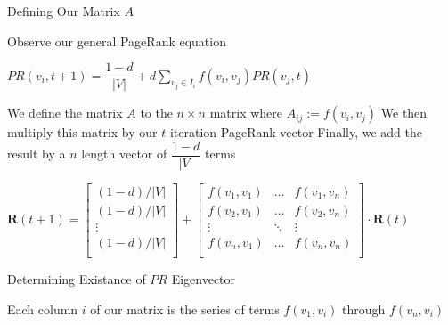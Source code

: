 \documentclass{beamer}
\begin{document}
\begin{frame}[t]{Defining Our Matrix $A$}
    \begin{outline}
        \1 Observe our general PageRank equation
        \begin{mdframed}[backgroundcolor=blue!20]
            \begin{center}
                \begin{math}
                    PR(v_i, t+1) = \dfrac{1-d}{|V|} + d\sum\limits_{v_j \in I_i} f(v_i, v_j) PR(v_j, t)
                \end{math}
            \end{center}
        \end{mdframed}
        \1 We define the matrix $A$ to the $n\times n$ matrix where $A_{ij}:= f(v_i, v_j)$
        \1 We then multiply this matrix by our $t$ iteration PageRank vector
        \1 Finally, we add the result by a $n$ length vector of $\dfrac{1-d}{|V|}$ terms
        \begin{center}
            \begin{math}
                \mathbf{R}(t+1) = \begin{bmatrix}
                    (1-d)/|V|\\
                    (1-d)/|V|\\
                    \vdots\\
                    (1-d)/|V|\\
                \end{bmatrix} + \begin{bmatrix}
                    f(v_1, v_1) & \ldots &f(v_1, v_n)\\
                    f(v_2, v_1) & \ldots &f(v_2, v_n)\\
                    \vdots & \ddots & \vdots \\
                    f(v_n, v_1) & \ldots &f(v_n, v_n)\\
                \end{bmatrix}\cdot \mathbf{R}(t)
            \end{math}
        \end{center}
    \end{outline}
\end{frame}

\begin{frame}[t]{Determining Existance of $PR$ Eigenvector}
    \begin{outline}
        \1 Each column $i$ of our matrix is the series of terms $f(v_1, v_i)$ through $f(v_n, v_i)$
    \end{outline}
\end{frame}
\end{document}
